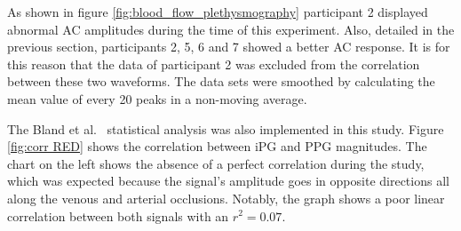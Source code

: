 As shown in figure \ref{fig:blood_flow_plethysmography} participant 2 displayed abnormal AC amplitudes during the time of this experiment. Also, detailed in the previous section, participants 2, 5, 6 and 7 showed a better AC response. It is for this reason that the data of participant 2 was excluded from the correlation between these two waveforms. The data sets were smoothed by calculating the mean value of every 20 peaks in a non-moving average.


The Bland et al.~\cite{bland1986statistical} statistical analysis was also implemented in this study. Figure \ref{fig:corr RED} shows the correlation between iPG and PPG magnitudes. The chart on the left shows the absence of a perfect correlation during the study, which was expected because the signal's amplitude goes in opposite directions all along the venous and arterial occlusions. Notably, the graph shows a poor linear correlation between both signals with an $r^2 = 0.07$.

